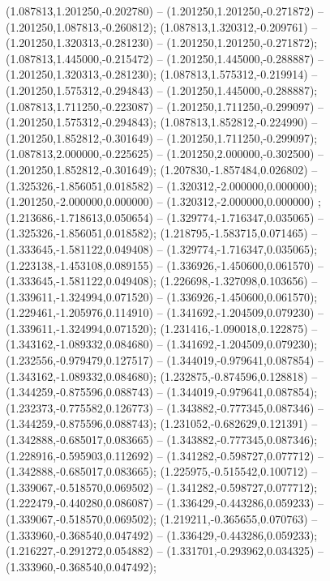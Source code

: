  (1.087813,1.201250,-0.202780) -- (1.201250,1.201250,-0.271872) -- (1.201250,1.087813,-0.260812);
 (1.087813,1.320312,-0.209761) -- (1.201250,1.320313,-0.281230) -- (1.201250,1.201250,-0.271872);
 (1.087813,1.445000,-0.215472) -- (1.201250,1.445000,-0.288887) -- (1.201250,1.320313,-0.281230);
 (1.087813,1.575312,-0.219914) -- (1.201250,1.575312,-0.294843) -- (1.201250,1.445000,-0.288887);
 (1.087813,1.711250,-0.223087) -- (1.201250,1.711250,-0.299097) -- (1.201250,1.575312,-0.294843);
 (1.087813,1.852812,-0.224990) -- (1.201250,1.852812,-0.301649) -- (1.201250,1.711250,-0.299097);
 (1.087813,2.000000,-0.225625) -- (1.201250,2.000000,-0.302500) -- (1.201250,1.852812,-0.301649);
 (1.207830,-1.857484,0.026802) -- (1.325326,-1.856051,0.018582) -- (1.320312,-2.000000,0.000000);
 (1.201250,-2.000000,0.000000) -- (1.320312,-2.000000,0.000000) ;
 (1.213686,-1.718613,0.050654) -- (1.329774,-1.716347,0.035065) -- (1.325326,-1.856051,0.018582);
 (1.218795,-1.583715,0.071465) -- (1.333645,-1.581122,0.049408) -- (1.329774,-1.716347,0.035065);
 (1.223138,-1.453108,0.089155) -- (1.336926,-1.450600,0.061570) -- (1.333645,-1.581122,0.049408);
 (1.226698,-1.327098,0.103656) -- (1.339611,-1.324994,0.071520) -- (1.336926,-1.450600,0.061570);
 (1.229461,-1.205976,0.114910) -- (1.341692,-1.204509,0.079230) -- (1.339611,-1.324994,0.071520);
 (1.231416,-1.090018,0.122875) -- (1.343162,-1.089332,0.084680) -- (1.341692,-1.204509,0.079230);
 (1.232556,-0.979479,0.127517) -- (1.344019,-0.979641,0.087854) -- (1.343162,-1.089332,0.084680);
 (1.232875,-0.874596,0.128818) -- (1.344259,-0.875596,0.088743) -- (1.344019,-0.979641,0.087854);
 (1.232373,-0.775582,0.126773) -- (1.343882,-0.777345,0.087346) -- (1.344259,-0.875596,0.088743);
 (1.231052,-0.682629,0.121391) -- (1.342888,-0.685017,0.083665) -- (1.343882,-0.777345,0.087346);
 (1.228916,-0.595903,0.112692) -- (1.341282,-0.598727,0.077712) -- (1.342888,-0.685017,0.083665);
 (1.225975,-0.515542,0.100712) -- (1.339067,-0.518570,0.069502) -- (1.341282,-0.598727,0.077712);
 (1.222479,-0.440280,0.086087) -- (1.336429,-0.443286,0.059233) -- (1.339067,-0.518570,0.069502);
 (1.219211,-0.365655,0.070763) -- (1.333960,-0.368540,0.047492) -- (1.336429,-0.443286,0.059233);
 (1.216227,-0.291272,0.054882) -- (1.331701,-0.293962,0.034325) -- (1.333960,-0.368540,0.047492);
